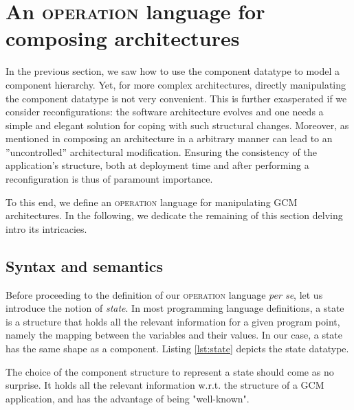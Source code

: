\section{An \textsc{operation} language for composing architectures}
\label{sec:op}



		In the previous section, we saw how to use the \textsf{component} datatype to model a component hierarchy.
	 Yet, for more complex architectures, directly manipulating the  \textsf{component} datatype is not very convenient.
	 This is further	 exasperated if we consider reconfigurations: the software architecture evolves 
	 and one needs a simple and elegant solution for coping with such structural changes. Moreover,
	 as mentioned in \cite{BHN:ICAS09} composing an architecture in a arbitrary manner can lead to an 
	 ”uncontrolled” architectural modification. Ensuring the consistency of the application's structure, both at 
	 deployment time and after performing a reconfiguration is thus of paramount importance.
	 
	  To this end, we define an \textsc{operation} language for manipulating \ac{GCM} architectures.
	In the following, we dedicate the remaining of this section delving intro its intricacies.
	 

\subsection{Syntax and semantics}
\label{sub:opsem}

		
	Before proceeding to the definition of our \textsc{operation} language \textit{per se}, let us introduce
	the notion of \textit{state}.	In most programming language definitions, a state is a structure
	that holds all the relevant information for a given program point, namely the mapping between
	the variables and their values. In our case, a \textsf{state} has the same shape as a \textsf{component}.
	Listing \ref{lst:state} depicts the \textsf{state} datatype.
	

			


	\noindent The choice of the \textsf{component} structure to represent a \textsf{state} should come as no surprise.
	It holds all the relevant information w.r.t. the structure of a \ac{GCM} application, and has the advantage of
	being "well-known".
	
